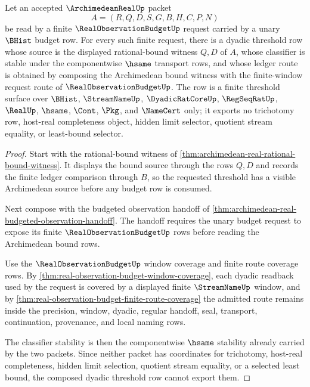 \begin{theorem}
\label{thm:archimedean-real-dyadic-threshold-totality}
Let an accepted $\ArchimedeanRealUp$ packet
$$
A=(R,Q,D,S,G,B,H,C,P,N)
$$
be read by a finite $\RealObservationBudgetUp$ request carried by a unary $\BHist$ budget row. For every such finite request, there is a dyadic threshold row whose source is the displayed rational-bound witness $Q,D$ of $A$, whose classifier is stable under the componentwise $\hsame$ transport rows, and whose ledger route is obtained by composing the Archimedean bound witness with the finite-window request route of $\RealObservationBudgetUp$. The row is a finite threshold surface over $\BHist$, $\StreamNameUp$, $\DyadicRatCoreUp$, $\RegSeqRatUp$, $\RealUp$, $\hsame$, $\Cont$, $\Pkg$, and $\NameCert$ only; it exports no trichotomy row, host-real completeness object, hidden limit selector, quotient stream equality, or least-bound selector.
\end{theorem}
\begin{proof}
Start with the rational-bound witness of \autoref{thm:archimedean-real-rational-bound-witness}. It displays the bound source through the rows $Q,D$ and records the finite ledger comparison through $B$, so the requested threshold has a visible Archimedean source before any budget row is consumed.

Next compose with the budgeted observation handoff of \autoref{thm:archimedean-real-budgeted-observation-handoff}. The handoff requires the unary budget request to expose its finite $\RealObservationBudgetUp$ rows before reading the Archimedean bound rows.

Use the $\RealObservationBudgetUp$ window coverage and finite route coverage rows. By \autoref{thm:real-observation-budget-window-coverage}, each dyadic readback used by the request is covered by a displayed finite $\StreamNameUp$ window, and by \autoref{thm:real-observation-budget-finite-route-coverage} the admitted route remains inside the precision, window, dyadic, regular handoff, seal, transport, continuation, provenance, and local naming rows.

The classifier stability is then the componentwise $\hsame$ stability already carried by the two packets. Since neither packet has coordinates for trichotomy, host-real completeness, hidden limit selection, quotient stream equality, or a selected least bound, the composed dyadic threshold row cannot export them.
\end{proof}

